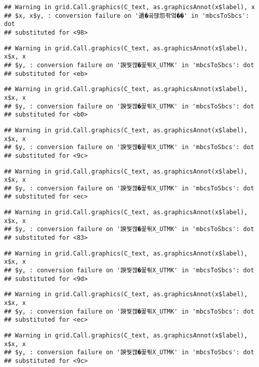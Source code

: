 \documentclass[]{article}
\begin{document}
\begin{verbatim}
## Warning in grid.Call.graphics(C_text, as.graphicsAnnot(x$label), x
## $x, x$y, : conversion failure on '遺�곸떊怨좎옄��' in 'mbcsToSbcs': dot
## substituted for <98>
\end{verbatim}

\begin{verbatim}
## Warning in grid.Call.graphics(C_text, as.graphicsAnnot(x$label), x$x, x
## $y, : conversion failure on '諛쒖깮�꾩튂X_UTMK' in 'mbcsToSbcs': dot
## substituted for <eb>
\end{verbatim}

\begin{verbatim}
## Warning in grid.Call.graphics(C_text, as.graphicsAnnot(x$label), x$x, x
## $y, : conversion failure on '諛쒖깮�꾩튂X_UTMK' in 'mbcsToSbcs': dot
## substituted for <b0>
\end{verbatim}

\begin{verbatim}
## Warning in grid.Call.graphics(C_text, as.graphicsAnnot(x$label), x$x, x
## $y, : conversion failure on '諛쒖깮�꾩튂X_UTMK' in 'mbcsToSbcs': dot
## substituted for <9c>
\end{verbatim}

\begin{verbatim}
## Warning in grid.Call.graphics(C_text, as.graphicsAnnot(x$label), x$x, x
## $y, : conversion failure on '諛쒖깮�꾩튂X_UTMK' in 'mbcsToSbcs': dot
## substituted for <ec>
\end{verbatim}

\begin{verbatim}
## Warning in grid.Call.graphics(C_text, as.graphicsAnnot(x$label), x$x, x
## $y, : conversion failure on '諛쒖깮�꾩튂X_UTMK' in 'mbcsToSbcs': dot
## substituted for <83>
\end{verbatim}

\begin{verbatim}
## Warning in grid.Call.graphics(C_text, as.graphicsAnnot(x$label), x$x, x
## $y, : conversion failure on '諛쒖깮�꾩튂X_UTMK' in 'mbcsToSbcs': dot
## substituted for <9d>
\end{verbatim}

\begin{verbatim}
## Warning in grid.Call.graphics(C_text, as.graphicsAnnot(x$label), x$x, x
## $y, : conversion failure on '諛쒖깮�꾩튂X_UTMK' in 'mbcsToSbcs': dot
## substituted for <ec>
\end{verbatim}

\begin{verbatim}
## Warning in grid.Call.graphics(C_text, as.graphicsAnnot(x$label), x$x, x
## $y, : conversion failure on '諛쒖깮�꾩튂X_UTMK' in 'mbcsToSbcs': dot
## substituted for <9c>
\end{verbatim}
\end{document}
